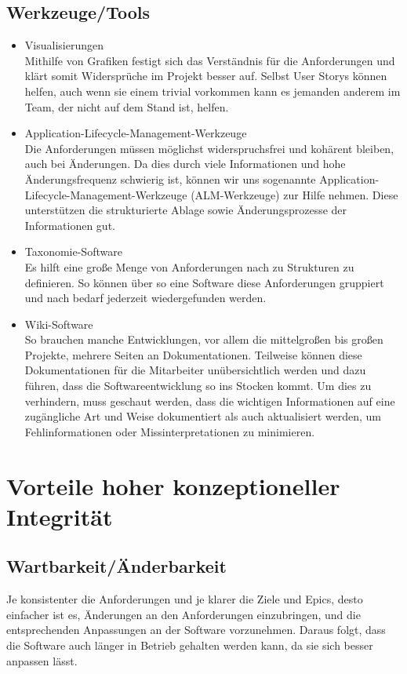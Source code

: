 \documentclass[a4paper, ngerman, 12pt, usenames, dvipsnames]{article}
\begin{document}
\subsection{Werkzeuge/Tools}
\begin{itemize}
\item Visualisierungen\\
Mithilfe von Grafiken festigt sich das Verständnis für die Anforderungen und klärt somit Widersprüche im Projekt besser auf. Selbst User Storys können helfen, auch wenn sie einem trivial vorkommen kann es jemanden anderem im Team, der nicht auf dem Stand ist, helfen.
\item Application-Lifecycle-Management-Werkzeuge\\
Die Anforderungen müssen möglichst widerspruchsfrei und kohärent bleiben, auch bei Änderungen. Da dies durch viele Informationen und hohe Änderungsfrequenz schwierig ist, können wir uns sogenannte Application-Lifecycle-Management-Werkzeuge (ALM-Werkzeuge) zur Hilfe nehmen. Diese unterstützen die strukturierte Ablage sowie Änderungsprozesse der Informationen gut.\
\item Taxonomie-Software\\
Es hilft eine große Menge von Anforderungen nach zu Strukturen zu definieren. So können über so eine Software diese Anforderungen gruppiert und nach bedarf jederzeit wiedergefunden werden.
\item Wiki-Software\\
So brauchen manche Entwicklungen, vor allem die mittelgroßen bis großen Projekte, mehrere Seiten an Dokumentationen. Teilweise können diese Dokumentationen für die Mitarbeiter unübersichtlich werden und dazu führen, dass die Softwareentwicklung so ins Stocken kommt. Um dies zu verhindern, muss geschaut werden, dass die wichtigen Informationen auf eine zugängliche Art und Weise dokumentiert als auch aktualisiert werden, um Fehlinformationen oder Missinterpretationen zu minimieren.
\end{itemize}
\section{Vorteile hoher konzeptioneller Integrität}
\subsection{Wartbarkeit/Änderbarkeit}
Je konsistenter die Anforderungen und je klarer die Ziele und Epics, desto einfacher ist es, Änderungen an den Anforderungen einzubringen, und die entsprechenden Anpassungen an der Software vorzunehmen. Daraus folgt, dass die Software auch länger in Betrieb gehalten werden kann, da sie sich besser anpassen lässt.
\end{document}
